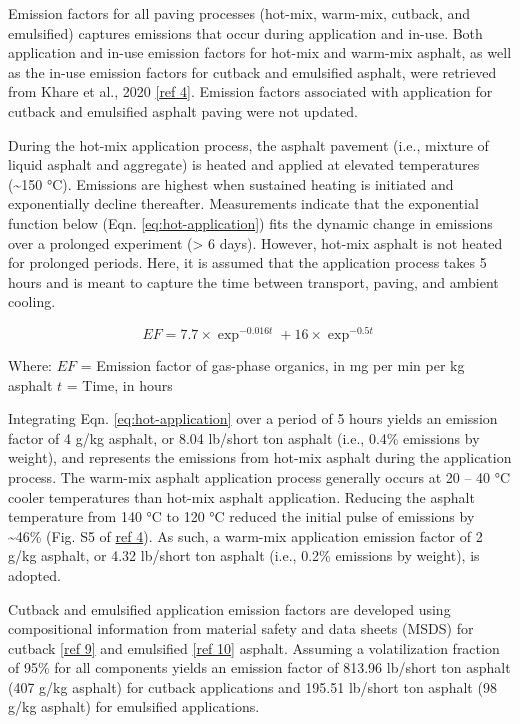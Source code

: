 \documentclass[
  11pt,
  oneside]{book}
\begin{document}
Emission factors for all paving processes (hot-mix, warm-mix, cutback, and emulsified) captures emissions that occur during application and in-use. Both application and in-use emission factors for hot-mix and warm-mix asphalt, as well as the in-use emission factors for cutback and emulsified asphalt, were retrieved from Khare et al., 2020 \hyperref[asphalt-references]{{[}ref 4{]}}. Emission factors associated with application for cutback and emulsified asphalt paving were not updated.

During the hot-mix application process, the asphalt pavement (i.e., mixture of liquid asphalt and aggregate) is heated and applied at elevated temperatures (\textasciitilde150 °C). Emissions are highest when sustained heating is initiated and exponentially decline thereafter. Measurements indicate that the exponential function below (Eqn. \eqref{eq:hot-application}) fits the dynamic change in emissions over a prolonged experiment (\textgreater{} 6 days). However, hot-mix asphalt is not heated for prolonged periods. Here, it is assumed that the application process takes 5 hours and is meant to capture the time between transport, paving, and ambient cooling.

\begin{equation} 
  EF = 7.7 \times \exp^{-0.016t} + 16 \times \exp^{-0.5t}
  \label{eq:hot-application}
\end{equation}

Where: \newline
\(EF\) = Emission factor of gas-phase organics, in mg per min per kg asphalt \newline
\(t\) = Time, in hours \newline

Integrating Eqn. \eqref{eq:hot-application} over a period of 5 hours yields an emission factor of 4 g/kg asphalt, or 8.04 lb/short ton asphalt (i.e., 0.4\% emissions by weight), and represents the emissions from hot-mix asphalt during the application process. The warm-mix asphalt application process generally occurs at 20 -- 40 °C cooler temperatures than hot-mix asphalt application. Reducing the asphalt temperature from 140 °C to 120 °C reduced the initial pulse of emissions by \textasciitilde46\% (Fig. S5 of \hyperref[asphalt-references]{ref 4}). As such, a warm-mix application emission factor of 2 g/kg asphalt, or 4.32 lb/short ton asphalt (i.e., 0.2\% emissions by weight), is adopted.

Cutback and emulsified application emission factors are developed using compositional information from material safety and data sheets (MSDS) for cutback \hyperref[asphalt-references]{{[}ref 9{]}} and emulsified \hyperref[asphalt-references]{{[}ref 10{]}} asphalt. Assuming a volatilization fraction of 95\% for all components yields an emission factor of 813.96 lb/short ton asphalt (407 g/kg asphalt) for cutback applications and 195.51 lb/short ton asphalt (98 g/kg asphalt) for emulsified applications.
\end{document}
